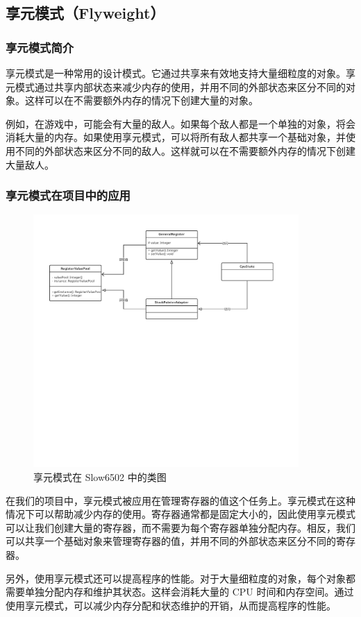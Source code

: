 \subsection{享元模式（Flyweight）}

\subsubsection{享元模式简介}

享元模式是一种常用的设计模式。它通过共享来有效地支持大量细粒度的对象。享元模式通过共享内部状态来减少内存的使用，并用不同的外部状态来区分不同的对象。这样可以在不需要额外内存的情况下创建大量的对象。

例如，在游戏中，可能会有大量的敌人。如果每个敌人都是一个单独的对象，将会消耗大量的内存。如果使用享元模式，可以将所有敌人都共享一个基础对象，并使用不同的外部状态来区分不同的敌人。这样就可以在不需要额外内存的情况下创建大量敌人。

\subsubsection{享元模式在项目中的应用}

\begin{figure}[H]
  \centering
  \includegraphics[width=0.9\textwidth]{figures/享元模式.pdf}
  \caption{享元模式在 Slow6502 中的类图}
\end{figure}

在我们的项目中，享元模式被应用在管理寄存器的值这个任务上。享元模式在这种情况下可以帮助减少内存的使用。寄存器通常都是固定大小的，因此使用享元模式可以让我们创建大量的寄存器，而不需要为每个寄存器单独分配内存。相反，我们可以共享一个基础对象来管理寄存器的值，并用不同的外部状态来区分不同的寄存器。

另外，使用享元模式还可以提高程序的性能。对于大量细粒度的对象，每个对象都需要单独分配内存和维护其状态。这样会消耗大量的 CPU 时间和内存空间。通过使用享元模式，可以减少内存分配和状态维护的开销，从而提高程序的性能。
